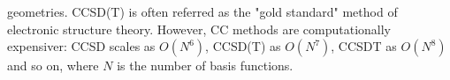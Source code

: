 geometries\cite{Bartlett}. CCSD(T) is often referred as the "gold standard" method of electronic structure 
theory. 
However, CC methods are computationally expensiver: CCSD scales as $O(N^6)$, CCSD(T) as
$O(N^7)$, CCSDT as $O(N^8)$ and so on, where $N$ is the number of basis functions.\\\\

